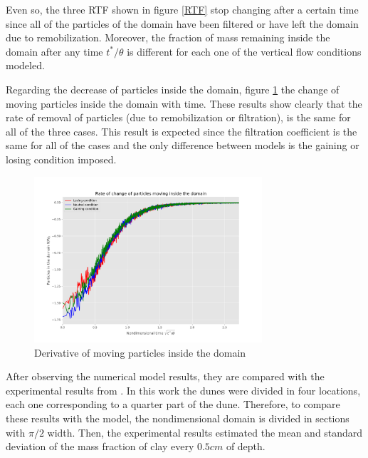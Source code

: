 \documentclass[draft,linenumbers]{agujournal2018}
\begin{document}
Even so, the three RTF shown in figure \ref{RTF} stop changing after a certain time since all of the particles of the domain have been filtered or have left the domain due to remobilization. Moreover, the fraction of mass remaining inside the domain after any time $t^*/\theta$ is different for each one of the vertical flow conditions modeled. 

Regarding the decrease of particles inside the domain, figure \ref{MOVder} the change of moving particles inside the domain with time. These results show clearly that the rate of removal of particles (due to remobilization or filtration), is the same for all of the three cases. This result is expected since the filtration coefficient is the same for all of the cases and the only difference between models is the gaining or losing condition imposed. 

\begin{figure}[ht]
\centering
\includegraphics[trim=0.2cm 0.2cm 0.2cm 0.2cm, width=20pc]
{181203_Moving_der.pdf}
\caption{Derivative of moving particles inside the domain}
\label{MOVder}
\end{figure}

After observing the numerical model results, they are compared with the experimental results from \citet{Fox2018}. In this work the dunes were divided in four locations, each one corresponding to a quarter part of the dune. Therefore, to compare these results with the model, the nondimensional domain is divided in sections with $\pi/2$ width. Then, the experimental results estimated the mean and standard deviation of the mass fraction of clay every $0.5cm$ of depth. 
\end{document}
